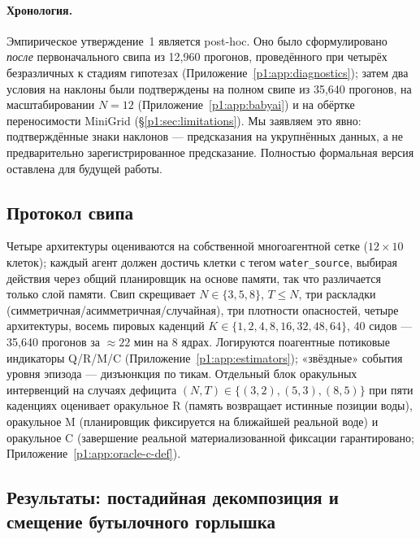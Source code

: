 \documentclass{article}
\begin{document}
\paragraph{Хронология.}
Эмпирическое утверждение~1 является post-hoc. Оно было сформулировано \emph{после} первоначального свипа из 12{,}960 прогонов, проведённого при четырёх безразличных к стадиям гипотезах (Приложение~\ref{p1:app:diagnostics}); затем два условия на наклоны были подтверждены на полном свипе из 35{,}640 прогонов, на масштабировании $N\!=\!12$ (Приложение~\ref{p1:app:babyai}) и на обёртке переносимости MiniGrid (\S\ref{p1:sec:limitations}). Мы заявляем это явно: подтверждённые знаки наклонов --- предсказания на укрупнённых данных, а не предварительно зарегистрированное
предсказание. Полностью формальная версия оставлена для будущей работы.

\subsection{Протокол свипа}
\label{p1:sec:multi-agent-protocol}

Четыре архитектуры оцениваются на собственной многоагентной сетке ($12{\times}10$ клеток); каждый агент должен достичь клетки с тегом \texttt{water\_source}, выбирая действия через общий планировщик на основе памяти, так что различается только слой памяти. Свип скрещивает $N{\in}\{3,5,8\}$, $T{\le}N$, три раскладки (симметричная/асимметричная/случайная), три плотности опасностей, четыре архитектуры, восемь пировых каденций $K{\in}\{1,2,4,8,16,32,48,64\}$, 40 сидов --- 35{,}640 прогонов за $\approx 22$ мин на 8 ядрах. Логируются поагентные потиковые индикаторы Q/R/M/C (Приложение~\ref{p1:app:estimators}); «звёздные» события уровня эпизода --- дизъюнкция по тикам. Отдельный блок оракульных интервенций на случаях дефицита $(N,T){\in}\{(3,2),(5,3),(8,5)\}$ при пяти каденциях оценивает оракульное R (память возвращает истинные позиции воды), оракульное M (планировщик фиксируется на ближайшей реальной воде) и оракульное C (завершение реальной материализованной фиксации гарантировано; Приложение~\ref{p1:app:oracle-c-def}).

\subsection{Результаты: постадийная декомпозиция и смещение бутылочного горлышка}
\label{p1:sec:multi-agent-results}
\end{document}
